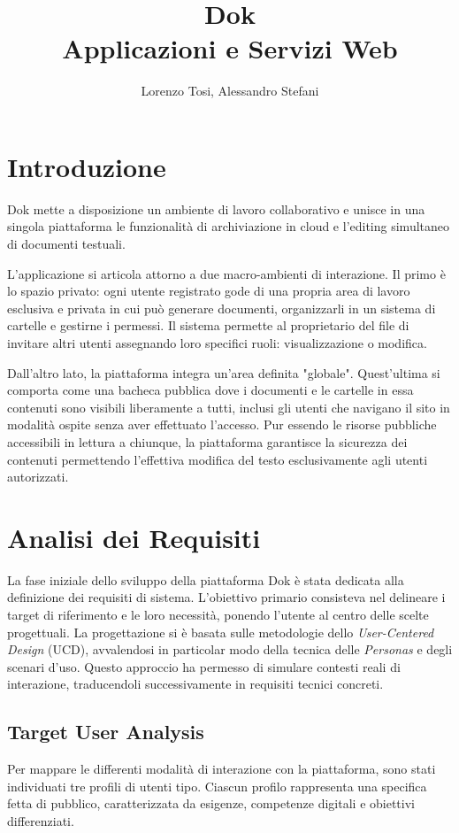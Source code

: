 \documentclass[11pt,a4paper]{report}
\title{\textbf{Dok} \\ \large Applicazioni e Servizi Web}
\author{Lorenzo Tosi, Alessandro Stefani}
\begin{document}
\maketitle

\tableofcontents
\newpage

\chapter{Introduzione}
Dok mette a disposizione un ambiente di lavoro collaborativo e unisce in una singola piattaforma le funzionalità di archiviazione in cloud e l'editing simultaneo di documenti testuali.

L'applicazione si articola attorno a due macro-ambienti di interazione. Il primo è lo spazio privato: ogni utente registrato gode di una propria area di lavoro esclusiva e privata in cui può generare documenti, organizzarli in un sistema di cartelle e gestirne i permessi. Il sistema permette al proprietario del file di invitare altri utenti assegnando loro specifici ruoli: visualizzazione o modifica.

Dall'altro lato, la piattaforma integra un'area definita "globale". Quest'ultima si comporta come una bacheca pubblica dove i documenti e le cartelle in essa contenuti sono visibili liberamente a tutti, inclusi gli utenti che navigano il sito in modalità ospite senza aver effettuato l'accesso. Pur essendo le risorse pubbliche accessibili in lettura a chiunque, la piattaforma garantisce la sicurezza dei contenuti permettendo l'effettiva modifica del testo esclusivamente agli utenti autorizzati.

\chapter{Analisi dei Requisiti}

La fase iniziale dello sviluppo della piattaforma Dok è stata dedicata alla definizione dei requisiti di sistema. L'obiettivo primario consisteva nel delineare i target di riferimento e le loro necessità, ponendo l'utente al centro delle scelte progettuali. La progettazione si è basata sulle metodologie dello \textit{User-Centered Design} (UCD), avvalendosi in particolar modo della tecnica delle \textit{Personas} e degli scenari d'uso. Questo approccio ha permesso di simulare contesti reali di interazione, traducendoli successivamente in requisiti tecnici concreti.

\section{Target User Analysis}
Per mappare le differenti modalità di interazione con la piattaforma, sono stati individuati tre profili di utenti tipo. Ciascun profilo rappresenta una specifica fetta di pubblico, caratterizzata da esigenze, competenze digitali e obiettivi differenziati.
\end{document}
